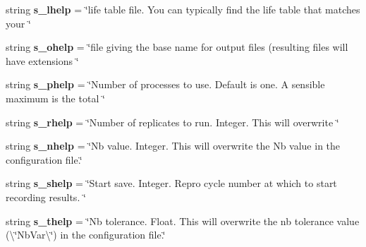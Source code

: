 \begin{DoxyCompactItemize}
\item 
string {\bfseries s\+\_\+lhelp} = \char`\"{}life table file. You can typically find the life table that matches your \char`\"{}\hypertarget{namespacenegui_1_1pgdrivesimulation_ab839b8be5866c9a4cee16d3df20d816a}{}\label{namespacenegui_1_1pgdrivesimulation_ab839b8be5866c9a4cee16d3df20d816a}

\item 
string {\bfseries s\+\_\+ohelp} = \char`\"{}file giving the base name for output files (resulting files will have extensions \char`\"{}\hypertarget{namespacenegui_1_1pgdrivesimulation_a341c333c1220a0589a5353ad50f41eb8}{}\label{namespacenegui_1_1pgdrivesimulation_a341c333c1220a0589a5353ad50f41eb8}

\item 
string {\bfseries s\+\_\+phelp} = \char`\"{}Number of processes to use. Default is one. A sensible maximum is the total \char`\"{}\hypertarget{namespacenegui_1_1pgdrivesimulation_ae746e076d088a7e90d3ff61f567bb852}{}\label{namespacenegui_1_1pgdrivesimulation_ae746e076d088a7e90d3ff61f567bb852}

\item 
string {\bfseries s\+\_\+rhelp} = \char`\"{}Number of replicates to run. Integer. This will overwrite \char`\"{}\hypertarget{namespacenegui_1_1pgdrivesimulation_a8677b8e4056a61c490a2b830d7ce5790}{}\label{namespacenegui_1_1pgdrivesimulation_a8677b8e4056a61c490a2b830d7ce5790}

\item 
string {\bfseries s\+\_\+nhelp} = \char`\"{}Nb value. Integer. This will overwrite the Nb value in the configuration file.\char`\"{}\hypertarget{namespacenegui_1_1pgdrivesimulation_ababf128ae12fda99d04f7391c01ef194}{}\label{namespacenegui_1_1pgdrivesimulation_ababf128ae12fda99d04f7391c01ef194}

\item 
string {\bfseries s\+\_\+shelp} = \char`\"{}Start save. Integer. Repro cycle number at which to start recording results. \char`\"{}\hypertarget{namespacenegui_1_1pgdrivesimulation_ae333a939e8f0e1c8dc9ec054974e6291}{}\label{namespacenegui_1_1pgdrivesimulation_ae333a939e8f0e1c8dc9ec054974e6291}

\item 
string {\bfseries s\+\_\+thelp} = \char`\"{}Nb tolerance. Float. This will overwrite the nb tolerance value (\textbackslash{}\char`\"{}Nb\+Var\textbackslash{}\char`\"{}) in the configuration file.\char`\"{}\hypertarget{namespacenegui_1_1pgdrivesimulation_aabcf6a9aa21d58b53e30727cef9a0acc}{}\label{namespacenegui_1_1pgdrivesimulation_aabcf6a9aa21d58b53e30727cef9a0acc}


\end{DoxyCompactItemize}
